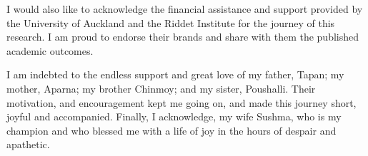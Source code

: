 I would also like to acknowledge the financial assistance and support provided by the University of Auckland and the Riddet Institute for the journey of this research. I am proud to endorse their
brands and share with them the published academic outcomes.

I am indebted to the endless support and great love of my father, Tapan; my mother, Aparna; my brother Chinmoy; and my sister, Poushalli. Their motivation, and encouragement kept me going on, and made this journey short, joyful and accompanied. Finally, I acknowledge, my wife Sushma, who is my champion and who blessed me with a life of joy in the hours of despair and apathetic. 


\endgroup



